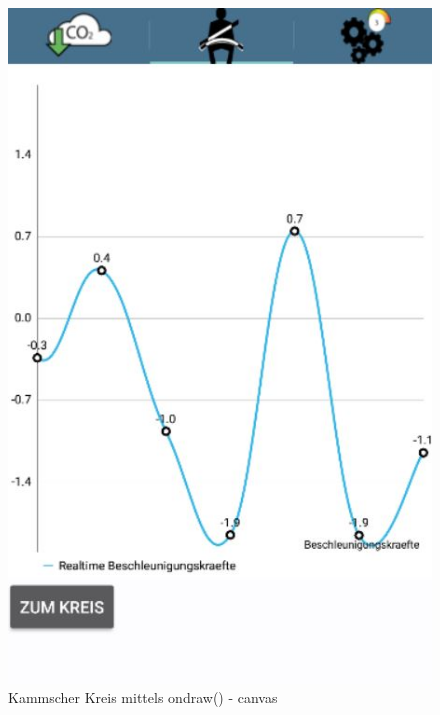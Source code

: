 \begin{figure}[!tbp]
 	\hfill
 	\begin{minipage}[b]{0.4\textwidth}
 		\includegraphics[width=\textwidth]{images/Liniendiagramm}
 		\caption{Kammscher Kreis mittels ondraw() - canvas}
 	\end{minipage}
\end{figure}
 

\clearpage %
